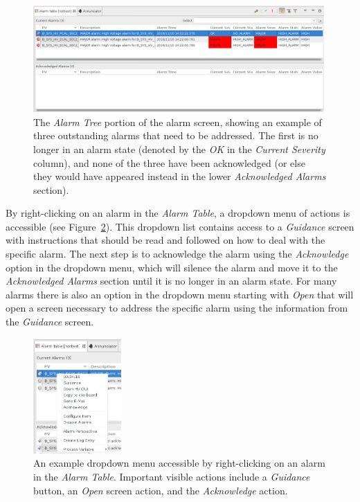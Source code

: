 \documentclass[amsmath,amssymb,notitlepage,11pt]{revtex4}
\begin{document}
\begin{figure}[htbp]\centering
  \includegraphics[width=0.99\textwidth]{pics/alarmtree}
  \caption{The {\em Alarm Tree} portion of the alarm screen, showing an example of three outstanding alarms that need to be addressed.  The first is no longer in an alarm state (denoted by the {\em OK} in the {\em Current Severity} column), and none of the three have been acknowledged (or else they would have appeared instead in the lower {\em Acknowledged Alarms} section).\label{fig:alarmtree}}
\end{figure}

By right-clicking on an alarm in the {\em Alarm Table}, a dropdown menu of actions is accessible (see Figure~\ref{fig:alarmguide}).  This dropdown list contains access to a {\em Guidance} screen with instructions that should be read and followed on how to deal with the specific alarm.  The next step is to acknowledge the alarm using the {\em Acknowledge} option in the dropdown menu, which will silence the alarm and move it to the {\em Acknowledged Alarms} section until it is no longer in an alarm state.  For many alarms there is also an option in the dropdown menu starting with {\em Open} that will open a screen necessary to address the specific alarm using the information from the {\em Guidance} screen.

\begin{figure}[htbp]\centering
  \includegraphics[width=0.3\textwidth]{pics/alarmguide}
  \caption{An example dropdown menu accessible by right-clicking on an alarm in the {\em Alarm Table}.  Important visible actions include a {\em Guidance} button, an {\em Open} screen action, and the {\em Acknowledge} action.\label{fig:alarmguide}}
\end{figure}
\end{document}
